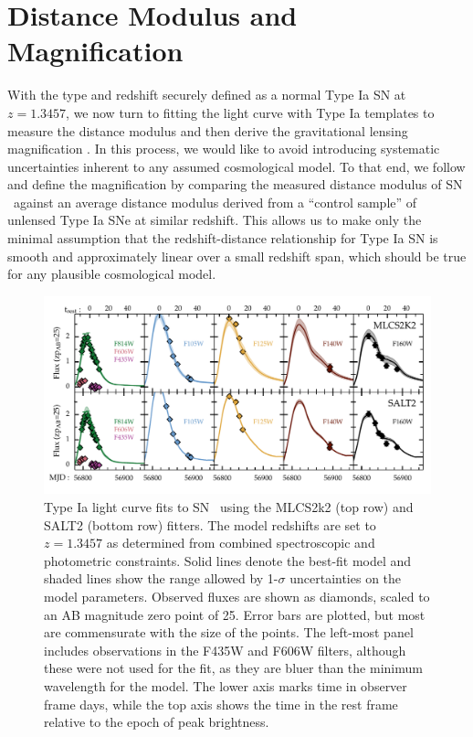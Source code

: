 \section{Distance Modulus and Magnification}
\label{sec:DistanceAndMagnification}

With the type and redshift securely defined as a normal Type Ia SN at
$z=1.3457$, we now turn to fitting the light curve with Type Ia
templates to measure the distance
modulus \change{(\S\ref{sec:LightCurveFitting})} and then derive the
gravitational lensing
magnification \change{(\S\ref{sec:ControlSampleComparison})}.  In this
process, we would like to avoid introducing systematic uncertainties
inherent to any assumed cosmological model.  To that end,  we
follow \citealt{Patel:2014} and define the magnification by comparing
the measured distance modulus of SN \tomas\ against an average
distance modulus derived from a ``control sample'' of unlensed Type Ia
SNe at similar redshift. This allows us to make only the minimal
assumption that the redshift-distance relationship for Type Ia SN is
smooth and approximately linear over a small redshift span, which
should be true for any plausible cosmological model.


\begin{figure}
\begin{center}
\includegraphics[width=\textwidth]{FIG/snTomas_lightcurve_fit_fluxAB25}
\caption{ Type Ia light curve fits to SN \tomas\ using the MLCS2k2
(top row) and SALT2 (bottom row) fitters. The model redshifts are set to
$z=1.3457$ as determined from combined
spectroscopic and photometric constraints.  Solid lines denote the
best-fit model and shaded lines show the range allowed by 1-$\sigma$
uncertainties on the model parameters. 
Observed fluxes are shown as diamonds, scaled to an AB magnitude
zero point of 25. Error bars are plotted, but most are commensurate
with the size of the points. The left-most panel includes observations
in the F435W and F606W filters, although these were not used for the
fit, as they are bluer than the minimum wavelength for the model. The
lower axis marks time in observer frame days, while the top axis shows
the time in the rest frame relative to the epoch of peak brightness.
\label{fig:LightCurveFits} }
\end{center}
\end{figure}


